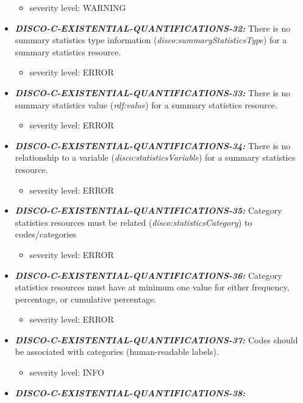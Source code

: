 \documentclass{llncs}
\begin{document}
\begin{itemize}
	\begin{itemize}
		\item severity level: WARNING
	\end{itemize}
	\item \textbf{{\em DISCO-C-EXISTENTIAL-QUANTIFICATIONS-32:}} 
  There is no summary statistics type information (\emph{disco:summaryStatisticsType}) for a summary statistics resource.
	\begin{itemize}
		\item severity level: ERROR
	\end{itemize}
	\item \textbf{{\em DISCO-C-EXISTENTIAL-QUANTIFICATIONS-33:}} 
  There is no summary statistics value (\emph{rdf:value}) for a summary statistics resource.
	\begin{itemize}
		\item severity level: ERROR
	\end{itemize}
	\item \textbf{{\em DISCO-C-EXISTENTIAL-QUANTIFICATIONS-34:}} 
  There is no relationship to a variable (\emph{disco:statisticsVariable}) for a summary statistics resource.
	\begin{itemize}
		\item severity level: ERROR
	\end{itemize}
	\item \textbf{{\em DISCO-C-EXISTENTIAL-QUANTIFICATIONS-35:}} 
  Category statistics resources must be related (\emph{disco:statisticsCategory}) to codes/categories
	\begin{itemize}
		\item severity level: ERROR
	\end{itemize}
	\item \textbf{{\em DISCO-C-EXISTENTIAL-QUANTIFICATIONS-36:}} 
  Category statistics resources must have at minimum one value for either frequency, percentage, or cumulative percentage.
	\begin{itemize}
		\item severity level: ERROR
	\end{itemize}
	\item \textbf{{\em DISCO-C-EXISTENTIAL-QUANTIFICATIONS-37:}} 
  Codes should be associated with categories (human-readable labels).
	\begin{itemize}
		\item severity level: INFO
	\end{itemize}
	\item \textbf{{\em DISCO-C-EXISTENTIAL-QUANTIFICATIONS-38:}} 

\end{itemize}
\end{document}
